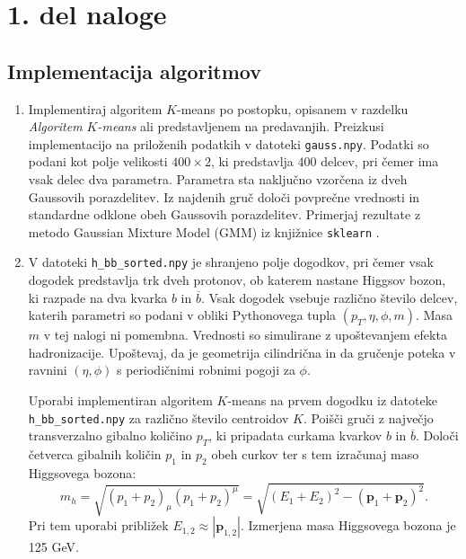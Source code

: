 \documentclass[slovene,11pt,a4paper]{article}
\begin{document}
\section*{1. del naloge}

\subsection*{Implementacija algoritmov}

\begin{enumerate}
    \item[1.] Implementiraj algoritem $K$-means po postopku, opisanem v razdelku \emph{Algoritem $K$-means} ali predstavljenem na predavanjih. Preizkusi implementacijo na priloženih podatkih v datoteki \texttt{gauss.npy}. Podatki so podani kot polje velikosti $400 \times 2$, ki predstavlja 400 delcev, pri čemer ima vsak delec dva parametra. Parametra sta naključno vzorčena iz dveh Gaussovih porazdelitev.  
    Iz najdenih gruč določi povprečne vrednosti in standardne odklone obeh Gaussovih porazdelitev.  
    Primerjaj rezultate z metodo Gaussian Mixture Model (GMM) iz knjižnice \texttt{sklearn} \cite{sklearn-gmm}.


    \item[2.] V datoteki \texttt{h\_bb\_sorted.npy} je shranjeno polje dogodkov, pri čemer vsak dogodek predstavlja trk dveh protonov, ob katerem nastane Higgsov bozon, ki razpade na dva kvarka $b$ in $\overline{b}$. Vsak dogodek vsebuje različno število delcev, katerih parametri so podani v obliki Pythonovega tupla $(p_T, \eta, \phi, m)$. Masa $m$ v tej nalogi ni pomembna. Vrednosti so simulirane z upoštevanjem efekta hadronizacije. Upoštevaj, da je geometrija cilindrična in da gručenje poteka v ravnini $(\eta, \phi)$ s periodičnimi robnimi pogoji za $\phi$.
    

    Uporabi implementiran algoritem $K$-means na prvem dogodku iz datoteke \texttt{h\_bb\_sorted.npy} za različno število centroidov $K$. Poišči gruči z največjo transverzalno gibalno količino $p_T$, ki pripadata curkama kvarkov $b$ in $\overline{b}$. Določi četverca gibalnih količin $p_1$ in $p_2$ obeh curkov ter s tem izračunaj maso Higgsovega bozona:
    \begin{equation}
    m_h = \sqrt{(p_1 + p_2)_{\mu}(p_1 + p_2)^{\mu}} = \sqrt{(E_1 + E_2)^2 - (\mathbf{p}_1 + \mathbf{p}_2)^2}.
    \end{equation}
    Pri tem uporabi približek $E_{1,2} \approx |\mathbf{p}_{1,2}|$.
    Izmerjena masa Higgsovega bozona je 125 GeV.    


\end{enumerate}
\end{document}
